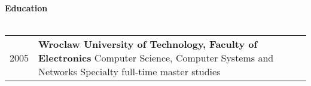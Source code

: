 \textbf{Education}
\\
\\
\begin{tabular}{p{}|p{}}
2005\textemdash2010
&
\textbf{Wroclaw University of Technology, Faculty of Electronics}\newline
Computer Science, Computer Systems and Networks Specialty\newline
full-time master studies\\
\end{tabular}